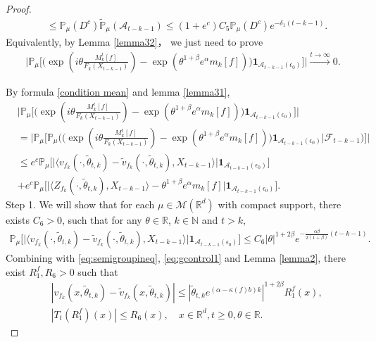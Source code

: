 \documentclass[12pt,oneside,english]{amsart}
\theoremstyle{plain}
\theoremstyle{definition}
\numberwithin{equation}{section}
\begin{document}
\begin{proof}
{\begin{align}
            &\leq \mathbb{P}_{\mu}(D^c)\mathbb{\tilde{P}}_{\mu}(\mathcal{A}_{t-k-1})\leq (1+e^c)C_5\mathbb{P}_{\mu}(D^c)e^{-\delta_1(t-k-1)}.
       \end{align}
       }
     Equivalently, by Lemma \ref{lemma32}， we just need to prove
     \begin{align}
        \Big|\mathbb{P}_{\mu}\Big[\big(\exp(i\theta \frac {M_k^t[f]}{F_k(X_{t-k-1})})-\exp(\theta^{1+\beta}e^{\alpha}m_k[f])\big)\mathbf{1}_{\mathcal{A}_{t-k-1}(\epsilon_0)}\Big]\Big|\xrightarrow{t\rightarrow\infty} 0.
    \end{align}
     
      By formula \eqref{condition mean} and lemma \ref{lemma31},
    \begin{align}
        &\Big|\mathbb{P}_{\mu}\Big[\big(\exp(i\theta \frac {M_k^t[f]}{F_k(X_{t-k-1})})-\exp(\theta^{1+\beta}e^{\alpha}m_k[f])\big)\mathbf{1}_{\mathcal{A}_{t-k-1}(\epsilon_0)}\Big]\Big|\\
        &=\Big|\mathbb{P}_{\mu}\Big[\mathbb{P}_{\mu}\Big(\big(\exp(i\theta \frac {M_k^t[f]}{F_k(X_{t-k-1})})-\exp(\theta^{1+\beta}e^{\alpha}m_k[f])\big)\mathbf{1}_{\mathcal{A}_{t-k-1}(\epsilon_0)}\Big|\mathcal{F}_{t-k-1}\Big)\Big]\Big|\\
        &\leq e^c\mathbb{P}_{\mu}\big[\big|\langle v_{f_k}(\cdot,\tilde{\theta}_{t,k})-\tilde{v}_{f_k}(\cdot,\tilde{\theta}_{t,k}), X_{t-k-1}\rangle\big|\mathbf{1}_{\mathcal{A}_{t-k-1}(\epsilon_0)}\big]\\
        \label{ineqinlem31}
        &+e^c\mathbb{P}_{\mu}\big[\big|\langle Z_{f_k}(\cdot,\tilde{\theta}_{t,k}),X_{t-k-1}\rangle-\theta^{1+\beta}e^{\alpha}m_k[f]\big|\mathbf{1}_{\mathcal{A}_{t-k-1}(\epsilon_0)}\big].
    \end{align}
Step 1.  We will show that for each $\mu \in\mathcal{M}(\mathbb{R}^d)$ with compact support, there exists $C_6>0$, such that for any $\theta\in \mathbb{R}$, $k\in\mathbb{N}$ and $t>k$,
    \begin{align}
    \label{lemma31q}
        \mathbb{P}_{\mu}\big[\big|\langle v_{f_k}(\cdot,\tilde{\theta}_{t,k})-\tilde{v}_{f_k}(\cdot,\tilde{\theta}_{t,k}), X_{t-k-1}\rangle\big|\mathbf{1}_{\mathcal{A}_{t-k-1}(\epsilon_0)}\big]\leq C_6|\theta|^{1+2\beta}e^{-\frac{\alpha\beta}{2(1+\beta)}(t-k-1)}.
    \end{align}
Combining with \eqref{eq:semigroupineq}, \eqref{eq:gcontrol1} and Lemma \ref{lemma2}, there exist $R_1^f,R_6>0$ such that
\begin{align}
    & |v_{f_k}(x,\tilde{\theta}_{t,k})-\tilde{v}_{f_k}(x,\tilde{\theta}_{t,k})|\leq |\tilde{\theta}_{t,k} e^{(\alpha-\kappa(f) b)k}|^{1+2\beta}R^f_1(x),\\
    & |T_t (R^f_1)(x)|\leq R_6(x), \quad x\in \mathbb{R}^d,t\geq 0, \theta \in \mathbb{R}.
\end{align}


\end{proof}
\end{document}
